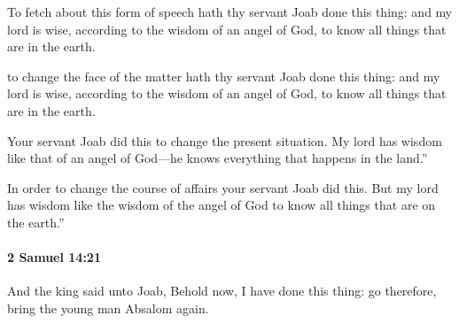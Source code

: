 			To fetch about this form of speech hath thy servant Joab done this thing: and my lord is wise, according to the wisdom of an angel of God, to know all things that are in the earth.

			\begin{versebox}
					\item[BHS] 
					\item[ASV] to change the face of the matter hath thy servant Joab done this thing: and my lord is wise, according to the wisdom of an angel of God, to know all things that are in the earth.
					\item[NIV] Your servant Joab did this to change the present situation. My lord has wisdom like that of an angel of God—he knows everything that happens in the land.”
					\item[NRSV] In order to change the course of affairs your servant Joab did this. But my lord has wisdom like the wisdom of the angel of God to know all things that are on the earth.”
			\end{versebox}

		\paragraph{2 Samuel 14:21} %
			\label{2SAMUEL-14-21}

			And the king said unto Joab, Behold now, I have done this thing: go therefore, bring the young man Absalom again.

